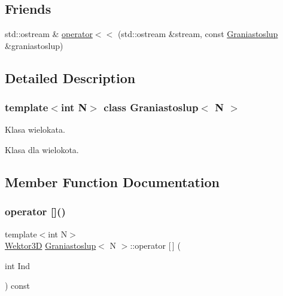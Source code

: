 \subsection*{Friends}
\begin{DoxyCompactItemize}
\item 
std\+::ostream \& \mbox{\hyperlink{class_graniastoslup_a16f3e79ecd1cf7191844403324ddc5cb}{operator$<$$<$}} (std\+::ostream \&stream, const \mbox{\hyperlink{class_graniastoslup}{Graniastoslup}} \&graniastoslup)
\end{DoxyCompactItemize}


\subsection{Detailed Description}
\subsubsection*{template$<$int N$>$\newline
class Graniastoslup$<$ N $>$}

Klasa wielokata. 

Klasa dla wielokota. 

\subsection{Member Function Documentation}
\mbox{\label{class_graniastoslup_a239b423d347cc3de286b805b564997b2}} 
\subsubsection{\texorpdfstring{operator []()}{operator []()}\hspace{0.1cm}{\footnotesize\ttfamily [1/2]}}
{\footnotesize\ttfamily template$<$int N$>$ \\
\mbox{\hyperlink{class_wektor}{Wektor3D}} \mbox{\hyperlink{class_graniastoslup}{Graniastoslup}}$<$ N $>$\+::operator \mbox{[}$\,$\mbox{]} (\begin{DoxyParamCaption}\item[{int}]{Ind }\end{DoxyParamCaption}) const\hspace{0.3cm}{\ttfamily [inline]}}

